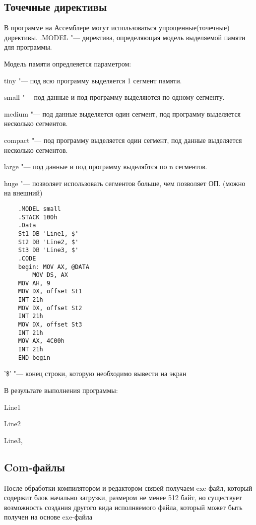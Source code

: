 \subsection{Точечные директивы}
В программе на Ассемблере могут использоваться упрощенные(точечные) директивы.
.MODEL "--- директива, определяющая модель выделяемой памяти для программы.

Модель памяти опредлеяется параметром:

tiny "--- под всю программу выделяется 1 сегмент памяти.

small "--- под данные и под программу выделяются по одному сегменту.

medium "--- под данные выделяется один сегмент, под программу выделяется несколько сегментов.

compact "--- под программу выделяется один сегмент, под данные выделяется несколько сегментов.

large "--- под данные и под программу выделябтся по n сегментов.

huge "--- позволяет использовать сегментов больше, чем позволяет ОП. (можно на внешний)

\begin{verbatim}
    .MODEL small
    .STACK 100h
    .Data
    St1 DB 'Line1, $'
    St2 DB 'Line2, $'
    St3 DB 'Line3, $'
    .CODE 
    begin: MOV AX, @DATA
        MOV DS, AX
    MOV AH, 9
    MOV DX, offset St1
    INT 21h
    MOV DX, offset St2
    INT 21h
    MOV DX, offset St3
    INT 21h
    MOV AX, 4C00h
    INT 21h
    END begin
\end{verbatim}

'\$' "--- конец строки, которую необходимо вывести на экран

В результате выполнения программы:

Line1

Line2

Line3,



\subsection{Com-файлы}
После обработки компилятором и редактором связей получаем exe-файл, который содержит блок начально загрузки, размером не менее 512 байт, но существует возможность создания другого вида исполняемого файла, который может быть получен на основе exe-файла 